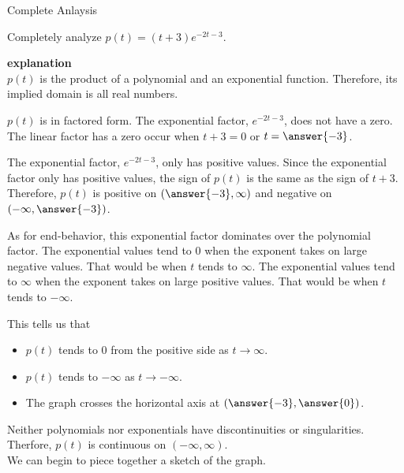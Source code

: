 \documentclass{ximera}
\begin{document}
\begin{example} Complete Anlaysis

Completely analyze $p(t) = (t+3)e^{-2t-3}$.

\textbf{\textcolor{purple!50!blue!90!black}{explanation}} \\


$p(t)$ is the product of a polynomial and an exponential function. Therefore, its implied domain is all real numbers.

$p(t)$ is in factored form.  The exponential factor, $e^{-2t-3}$, does not have a zero.  The linear factor has a zero occur when $t+3=0$ or $t=\answer{-3}$.  

The exponential factor, $e^{-2t-3}$, only has positive values.   Since the exponential factor only has positive values, the sign of $p(t)$ is the same as the sign of $t+3$.  Therefore, $p(t)$ is positive on $(\answer{-3}, \infty)$ and negative on $(-\infty, \answer{-3})$.  





As for end-behavior, this exponential factor dominates over the polynomial factor.  The exponential values tend to $0$ when the exponent takes on large negative values.  That would be when $t$ tends to $\infty$. The exponential values tend to $\infty$ when the exponent takes on large positive values.  That would be when $t$ tends to $-\infty$.  




This tells us that 

\begin{itemize}
\item $p(t)$ tends to $0$ from the positive side as $t \to \infty$.
\item $p(t)$ tends to $-\infty$ as $t \to -\infty$.
\item The graph crosses the horizontal axis at $\left( \answer{-3}, \answer{0} \right)$.
\end{itemize}



Neither polynomials nor exponentials have discontinuities or singularities.  Therfore, $p(t)$ is continuous on $(-\infty, \infty)$. \\






We can begin to piece together a sketch of the graph.







\end{example}
\end{document}
